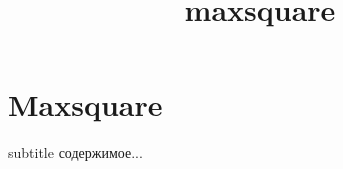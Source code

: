 \documentclass[utf8,xcolor=table,14pt]{beamer}
\begin{document}
	
\title{maxsquare}
\section{Maxsquare}

\begin{frame}{subtitle}
	содержимое...
\end{frame}
\end{document}
